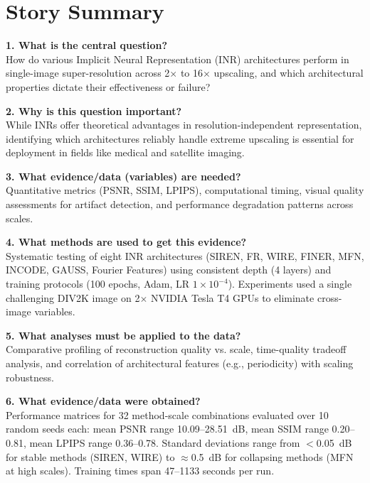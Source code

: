 \documentclass[a4paper,oneside,10pt,ngerman,english]{scrartcl}
\begin{document}
\cleardoubleoddpage
\section{Story Summary}
\label{sec:Story Summary}

\textbf{1. What is the central question?} \\
How do various Implicit Neural Representation (INR) architectures perform in single-image super-resolution across 2$\times$ to 16$\times$ upscaling, and which architectural properties dictate their effectiveness or failure?

\vspace{0.3cm}
\textbf{2. Why is this question important?} \\
While INRs offer theoretical advantages in resolution-independent representation, identifying which architectures reliably handle extreme upscaling is essential for deployment in fields like medical and satellite imaging.

\vspace{0.3cm}
\textbf{3. What evidence/data (variables) are needed?} \\
Quantitative metrics (PSNR, SSIM, LPIPS), computational timing, visual quality assessments for artifact detection, and performance degradation patterns across scales.

\vspace{0.3cm}
\textbf{4. What methods are used to get this evidence?} \\
Systematic testing of eight INR architectures (SIREN, FR, WIRE, FINER, MFN, INCODE, GAUSS, Fourier Features) using consistent depth (4 layers) and training protocols (100 epochs, Adam, LR $1 \times 10^{-4}$). Experiments used a single challenging DIV2K image on 2$\times$ NVIDIA Tesla T4 GPUs to eliminate cross-image variables.

\vspace{0.3cm}
\textbf{5. What analyses must be applied to the data?} \\
Comparative profiling of reconstruction quality vs. scale, time-quality tradeoff analysis, and correlation of architectural features (e.g., periodicity) with scaling robustness.

\vspace{0.3cm}
\textbf{6. What evidence/data were obtained?} \\
Performance matrices for 32 method-scale combinations evaluated over 10 random seeds each: mean PSNR range 10.09--28.51~dB, mean SSIM range 0.20--0.81, mean LPIPS range 0.36--0.78. Standard deviations range from $<$0.05~dB for stable methods (SIREN, WIRE) to $\approx$0.5~dB for collapsing methods (MFN at high scales). Training times span 47--1133 seconds per run.
\end{document}
